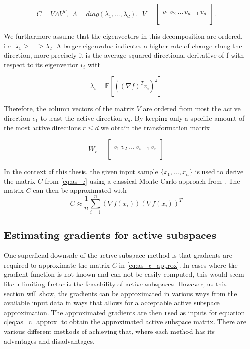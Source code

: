 \documentclass[
  a4paper,  %
  twoside,  %
  bibliography=totoc,
  headsepline,
  cleardoublepage=empty,
  parskip=half,
  draft=false
]{scrbook}
\begin{document}
\begin{equation}
C = V \Lambda V^T, ~~ \Lambda = diag(\lambda_1, ..., \lambda_d), ~~ V=
  \begin{bmatrix}
  \\
    v_1 ~ v_2 ~ \dots ~ v_{d-1} ~ v_d\\
    \\
  \end{bmatrix}.
\nonumber
\end{equation}

We furthermore assume that the eigenvectors in this decomposition are ordered, i.e. $\lambda_1 \geq ... \geq \lambda_d$.
A larger eigenvalue indicates a higher rate of change along the direction, more precisely it is the average squared directional derivative of f with respect to its eigenvector $v_i$ \cite{CG14} with

\begin{equation}
\lambda_i=\mathds{E}[((\nabla f)^T v_i)^2]
\label{eigenvalues}
\end{equation}

Therefore, the column vectors of the matrix $V$ are ordered from most the active direction $v_1$ to least the active direction $v_d$.
By keeping only a specific amount of the most active directions $r \leq d$ we obtain the transformation matrix

\begin{equation}
W_r=\begin{bmatrix}
  \\
    v_1 ~ v_2 ~ \dots ~ v_{i-1} ~ v_r\\
    \\
  \end{bmatrix}
\label{basis}
\end{equation}

In the context of this thesis, the given input sample $\{x_1, \dots, x_n\}$ is used to derive the matrix $C$ from \cref{eq:as_c} using a classical Monte-Carlo approach from \cite{}.
The matrix $C$ can then be approximated with
\begin{equation}
C \approx \frac{1}{n} \sum_{i=1}^n  (\nabla f(x_i)) (\nabla f(x_i))^T
\label{eq:as_c_approx}
\end{equation}

\subsection{Estimating gradients for active subspaces}

One superficial downside of the active subspace method is that gradients are required to approximate the matrix $C$ in \cref{eq:as_c_approx}.
In cases where the gradient function is not known and can not be easily computed, this would seem like a limiting factor is the feasability of active subspaces.
However, as this section will show, the gradients can be approximated in various ways from the available input data in ways that allows for a acceptable active subspace approximation.
The approximated gradients are then used as inputs for equation c\cref{eq:as_c_approx} to obtain the approximated active subspace matrix.
There are various different methods of achieving that, where each method has its advantages and disadvantages.
\end{document}
